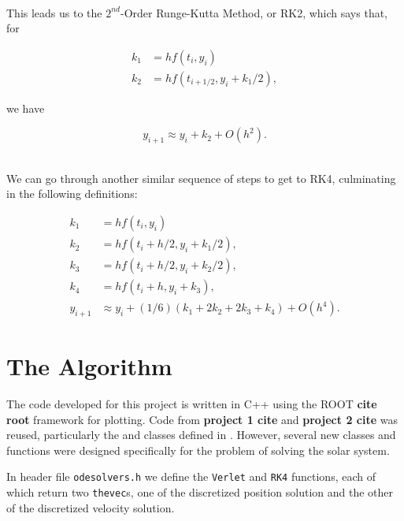 \documentclass[12pt]{article}
\numberwithin{equation}{section}
\begin{document}
\\\indent This leads us to the $2^{nd}$-Order Runge-Kutta Method, or RK2, which says that, for

\begin{equation}
\label{eq:rk2part1}
\begin{align}
k_{1} & = hf\left(t_{i},y_{i}\right) \\
k_{2} & = hf\left(t_{i+1/2},y_{i}+k_{1}/2\right),
\end{align}
\end{equation}

\noindent we have

\begin{equation}
\label{eq:re2part2}
y_{i+1} \approx y_{i}+k_{2}+O\left(h^{2}\right).
\end{equation}

\\\indent We can go through another similar sequence of steps to get to RK4, culminating in the following definitions:

\begin{equation}
\label{eq:rk4}
\begin{align}
k_{1} & = hf\left(t_{i},y_{i}\right) \\
k_{2} & = hf\left(t_{i}+h/2,y_{i}+k_{1}/2\right), \\
k_{3} & = hf\left(t_{i}+h/2,y_{i}+k_{2}/2\right), \\
k_{4} & = hf\left(t_{i}+h,y_{i}+k_{3}\right), \\
y_{i+1} & \approx y_{i}+\left(1/6\right)\left(k_{1}+2k_{2}+2k_{3}+k_{4}\right)+O\left(h^{4}\right).
\end{align}
\end{equation}

\section{The Algorithm}
\label{sec:algorithm}

The code developed for this project is written in C++ using the ROOT \textbf{cite root} framework for plotting.  Code from \textbf{project 1 cite} and \textbf{project 2 cite} was reused, particularly the  and  classes defined in .  However, several new classes and functions were designed specifically for the problem of solving the solar system.
\par In header file \texttt{odesolvers.h} we define the \texttt{Verlet} and \texttt{RK4} functions, each of which return two \texttt{thevec}s, one of the discretized position solution and the other of the discretized velocity solution.  
\end{document}

